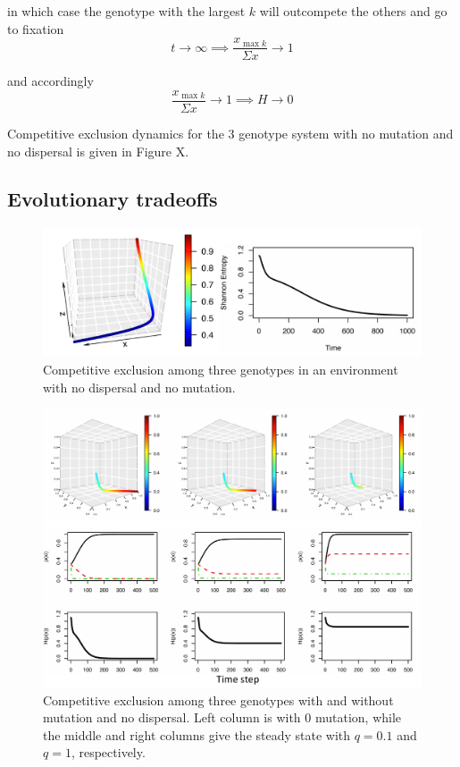 \documentclass[12pt]{article}
\begin{document}
in which case the genotype with the largest $k$ will outcompete the others and go to fixation
\[ t \rightarrow \infty\implies \frac{x_{\max{k}}}{\Sigma x} \rightarrow 1 \]

and accordingly
\[\frac{x_{\max{k}}}{\Sigma x} \rightarrow 1 \implies H \rightarrow 0 \] 

Competitive exclusion dynamics for the 3 genotype system with no mutation and no dispersal is given in Figure X. 

\subsection*{Evolutionary tradeoffs}



\newpage
\begin{figure}

 \hspace*{-2cm}\includegraphics[scale=0.65]{entropy3d.pdf}
 \caption{Competitive exclusion among three genotypes in an environment with no dispersal and no mutation.}
\end{figure}

\newpage

\begin{figure}
 \hspace*{-1cm}\includegraphics[scale=0.65]{entropy3x3.pdf}
 \caption{Competitive exclusion among three genotypes with and without mutation and no dispersal. Left column is with 0 mutation, while the middle and right columns give the steady state with $q=0.1$ and $q=1$, respectively.}
\end{figure}
 
 
\end{document}
